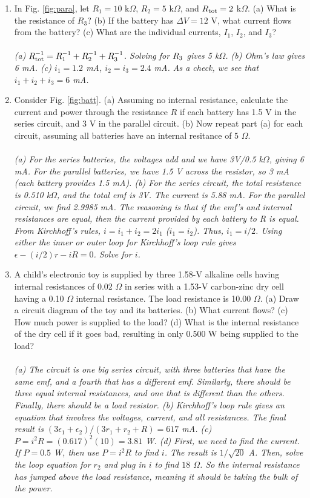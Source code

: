 \documentclass[12pt,twocolumn]{article}
\begin{document}
\begin{enumerate}
\item In Fig. \ref{fig:para}, let $R_1 = 10$ k$\Omega$, $R_2 = 5$ k$\Omega$, and $R_{\rm tot} = 2$ k$\Omega$.  (a) What is the resistance of $R_3$? (b) If the battery has $\Delta V = 12$ V, what current flows from the battery? (c) What are the individual currents, $I_1$, $I_2$, and $I_3$? \\ \\
\textit{(a) $R_{\rm tot}^{-1} = R_{\rm 1}^{-1} + R_{\rm 2}^{-1} + R_{\rm 3}^{-1}$.  Solving for $R_{\rm 3}$ gives 5 k$\Omega$. (b) Ohm's law gives 6 mA. (c) $i_1 = 1.2$ mA, $i_2 = i_3 = 2.4$ mA.  As a check, we see that $i_1 + i_2 + i_3 = 6$ mA.}
\item Consider Fig. \ref{fig:batt}. (a) Assuming no internal resistance, calculate the current and power through the resistance $R$ if each battery has 1.5 V in the series circuit, and 3 V in the parallel circuit. (b) Now repeat part (a) for each circuit, assuming all batteries have an internal resitance of $5$ $\Omega$. \\ \\
\textit{(a) For the series batteries, the voltages add and we have 3V/0.5 k$\Omega$, giving 6 mA.  For the parallel batteries, we have 1.5 V across the resistor, so 3 mA (each battery provides 1.5 mA). (b) For the series circuit, the total resistance is 0.510 k$\Omega$, and the total emf is 3V.  The current is 5.88 mA.  For the parallel circuit, we find 2.9985 mA.  The reasoning is that if the emf's and internal resistances are equal, then the current provided by each battery to R is equal.  From Kirchhoff's rules, $i = i_1 + i_2 = 2 i_1$ ($i_1 = i_2$).  Thus, $i_1 = i/2$.  Using either the inner or outer loop for Kirchhoff's loop rule gives $\epsilon - (i/2)r - iR = 0$.  Solve for $i$.}
\item A child's electronic toy is supplied by three 1.58-V alkaline cells having internal resistances of 0.02 $\Omega$ in series with a 1.53-V carbon-zinc dry cell having a 0.10 $\Omega$ internal resistance. The load resistance is 10.00 $\Omega$. (a) Draw a circuit diagram of the toy and its batteries. (b) What current flows? (c) How much power is supplied to the load? (d) What is the internal resistance of the dry cell if it goes bad, resulting in only 0.500 W being supplied to the load? \\ \\
\textit{(a) The circuit is one big series circuit, with three batteries that have the same emf, and a fourth that has a different emf.  Similarly, there should be three equal internal resistances, and one that is different than the others. Finally, there should be a load resistor. (b) Kirchhoff's loop rule gives an equation that involves the voltages, current, and all resistances.  The final result is $(3 \epsilon_1 + \epsilon_2)/(3r_1 + r_2 + R) = 617$ mA.  (c) $P = i^2R = (0.617)^2 (10) = 3.81$ W. (d) First, we need to find the current.  If $P = 0.5$ W, then use $P = i^2 R$ to find $i$.  The result is $1/\sqrt{20}$ A.  Then, solve the loop equation for $r_2$ and plug in $i$ to find $18$ $\Omega$.  So the internal resistance has jumped above the load resistance, meaning it should be taking the bulk of the power.}

\end{enumerate}
\end{document}
